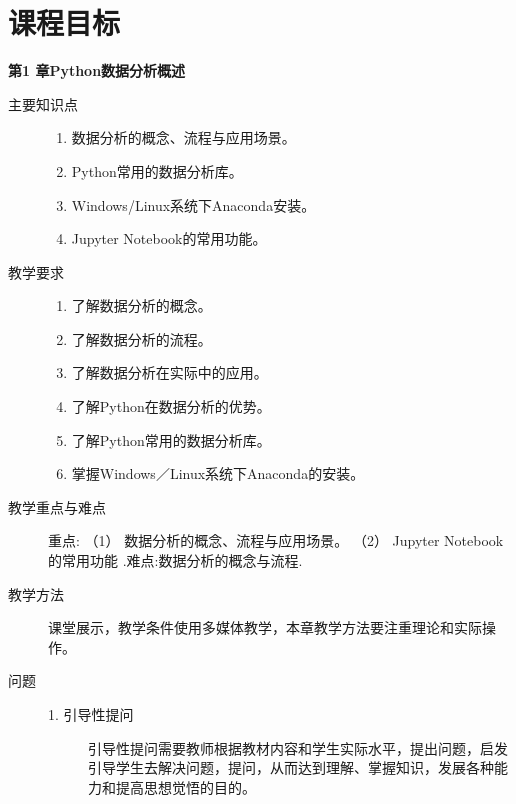 \documentclass[12pt,a4paper,openany,cap]{ctexbook}
\begin{document}
\section{课程目标}
\begin{center}
   \textbf{第1 章\quad Python数据分析概述}
\end{center}
\begin{description}
\item[主要知识点]
  \begin{minipage}[t]{0.8\linewidth}
     \begin{enumerate}
  \item      数据分析的概念、流程与应用场景。
\item\label{item:48}    Python常用的数据分析库。
\item\label{item:49}      Windows/Linux系统下Anaconda安装。
\item\label{item:50}      Jupyter Notebook的常用功能。
  \end{enumerate}
  \end{minipage}
\item[教学要求]
  \begin{minipage}[t]{0.8\linewidth}
    \begin{enumerate}
  \item     了解数据分析的概念。
\item\label{item:43}  了解数据分析的流程。
\item\label{item:44}  了解数据分析在实际中的应用。
\item\label{item:45}  了解Python在数据分析的优势。
\item\label{item:46}  了解Python常用的数据分析库。
\item\label{item:47}  掌握Windows／Linux系统下Anaconda的安装。
  \end{enumerate}
  \end{minipage}
\item[教学重点与难点]   
       重点:     （1） 数据分析的概念、流程与应用场景。
    （2） Jupyter Notebook的常用功能
.难点:数据分析的概念与流程.
\item[教学方法]课堂展示，教学条件使用多媒体教学，本章教学方法要注重理论和实际操作。
\item[问题]
  \begin{description}
  \item[1. 引导性提问]             
引导性提问需要教师根据教材内容和学生实际水平，提出问题，启发引导学生去解决问题，提问，从而达到理解、掌握知识，发展各种能力和提高思想觉悟的目的。
\begin{enumerate}

\end{enumerate}
\end{description}
\end{description}
\end{document}
